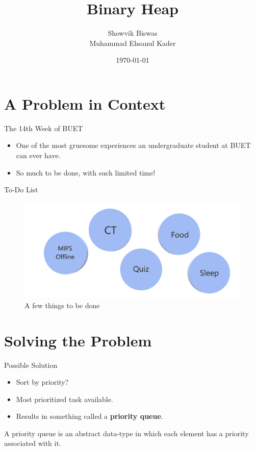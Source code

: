 \documentclass{beamer}
\title{Binary Heap}
\author[1805068, 1805067]{Showvik Biswas\\Muhammad Ehsanul Kader}
\institute{Department of CSE, BUET}
\date{\today}
\begin{document}
\frame{\titlepage}

\section{A Problem in Context}

\frame{\tableofcontents[currentsection]}

\begin{frame}{The 14th Week of BUET}
\begin{itemize}
    \item One of the most gruesome experiences an undergraduate student at BUET can ever have.
    \pause
    \item So much to be done, with such limited time!
\end{itemize}
\end{frame}

\begin{frame}{To-Do List}
    \begin{figure}
        \centering
        \includegraphics[scale=0.25]{1.png}
        \caption{A few things to be done}
        \label{fig:my_label}
    \end{figure}
\end{frame}
\section{Solving the Problem}
\frame{\tableofcontents[currentsection]}
\begin{frame}{Possible Solution}
\begin{itemize}
    \item Sort by priority?
    \pause
    \item Most prioritized task available.
    \pause
    \item Results in something called a \textbf{priority queue}.
\end{itemize}
\pause
\begin{definition}
A priority queue is an abstract data-type in which each element has a priority associated with it.
\end{definition}
\end{frame}
\end{document}

